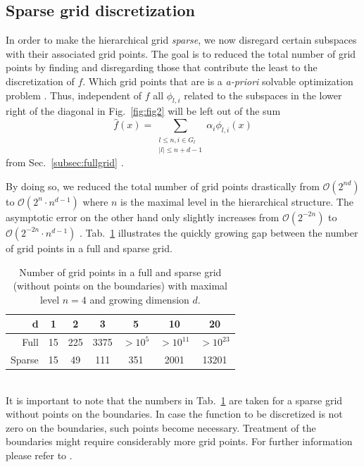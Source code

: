 \subsection{Sparse grid discretization}
In order to make the hierarchical grid \emph{sparse}, we now disregard certain
subspaces with their associated  grid points. The goal is to reduced the total
number of grid points by finding and disregarding those that contribute the
least to the discretization of $f$.
Which grid points that are is a \emph{a-priori}
solvable optimization problem \cite{disspfl}. 
Thus, independent of $f$ all $\phi_{l,i}$
related to the subspaces in the
lower right of the diagonal in Fig.~\ref{fig:fig2} will be left out of the sum
$$\hat{f}(x) =  \sum_{\substack{l \leq n, i \in G_l\\
    |l| \leq n + d - 1}}{\alpha_i\phi_{l,i}(x)}$$
from Sec.~\ref{subsec:fullgrid} \cite{disspfl, artbunshort}.
\par
By doing so, we reduced the total number of grid points drastically
from $\mathcal{O}(2^{nd})$ to $\mathcal{O}(2^{n} \cdot n^{d-1})$ where $n$ is
the maximal level in the hierarchical structure. The asymptotic error on the
other hand only slightly increases from $\mathcal{O}(2^{-2n})$ to
\mbox{$\mathcal{O}(2^{-2n} \cdot n^{d-1})$} \cite{disspfl}. Tab.~\ref{tab:tab1}
illustrates the quickly
growing gap between the number of grid points in a full and sparse grid.
\begin{table}[h]
  \centering
  \begin{tabular}{r | c | c | c | c | c | c}
    d & 1 & 2 & 3 & 5 & 10 & 20 \\
    \hline\hline
    Full & 15 &  225 & 3375 & $>10^5$ & $> 10^{11}$ & $> 10^{23}$ \\
    \hline
    Sparse & 15 & 49 & 111 & 351 & 2001 & 13201 \\
  \end{tabular}
  \captionsetup{width=0.44\textwidth}
  \caption{Number of grid points in a full and sparse grid
    (without points on the boundaries)
    with maximal level $n = 4$ and growing dimension $d$.\label{tab:tab1}}
\end{table}\\
It is important to note that the numbers in Tab.~\ref{tab:tab1} are taken
for a sparse grid without points on the boundaries. In case the function
to be discretized is not zero on the boundaries, such points become necessary.
Treatment of the boundaries might require considerably
more grid points. For further information please refer to
\cite{disspfl, disspeh}.

